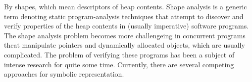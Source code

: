 
 



By shapes, which mean descriptors of heap contents. Shape analysis is a generic term denoting static
program-analysis techniques that attempt to discover and verify properties of the heap contents in (usually imperative) software  programs. The shape analysis problem becomes more challengeing in concurrent programs thcat manipulate pointers and dynamically allocated objects, which are usually complicated. 
The problem of verifying these programs has been a subject of intense research for quite some time. Currently, there are several competing approaches for symbolic representation.

 

